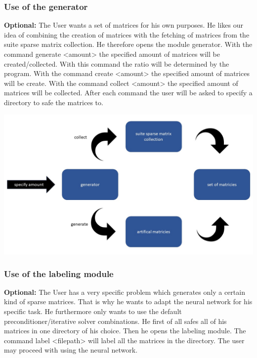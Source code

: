 \documentclass[parskip=full]{scrartcl}
\begin{document}
\subsubsection{Use of the generator}
\textbf{Optional:} The User wants a set of matrices for his own purposes. He likes our idea of combining the creation of matrices with the fetching of matrices from the suite sparse matrix collection. He therefore opens the module generator. With the command generate <amount> the specified amount of matrices will be created/collected. With this command the ratio will be determined by the program. With the command create <amount> the specified amount of matrices will be create.  With the command collect <amount> the specified amount of matrices will be collected. After each command the user will be asked to specify a directory to safe the matrices to.
\begin{center}
\includegraphics[width=\textwidth]{generator}
\end{center}

\subsubsection{Use of the labeling module}
\textbf{Optional:} The User has a very specific problem which generates only a certain kind of sparse matrices. That is why he wants to adapt the neural network for his specific task. He furthermore only wants to use the default preconditioner/iterative solver combinations. He first of all safes all of his matrices in one directory of his choice. Then he opens the labeling module. The command label <filepath> will label all the matrices in the directory. The user may proceed with using the neural network.
\end{document}
